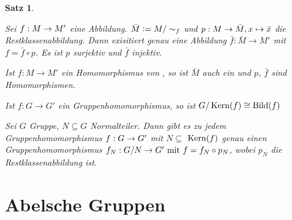 \documentclass[a4paper,10pt,german]{scrbook}
\theoremstyle{saetze}
\newtheorem{Satz}{Satz}
\theoremstyle{definitionen}
\begin{document}
\begin{Satz}
\label{Satz 1}
\mbox{}
\begin{enum}
\item 
Sei $f: M \rightarrow M'$ eine Abbildung. $\bar M \mathrel{\mathop:}=
M/\sim_f$ und $p: M \rightarrow \bar M, x \mapsto \bar x$ die
Restklassenabbildung.
Dann exisitiert genau eine Abbildung $\bar f: \bar M \to M'$ mit $f = \bar f\circ p$. Es ist $p$ surjektiv und $\bar f$ injektiv.

\item Ist $f:M \to M'$ ein Homomorphismus von \bla, so ist $\bar M$ auch ein \bla und $p$, $\bar f$ sind Homomorphismen.

\item {} \newline
Ist $f:G \to G'$ ein Gruppenhomomorphismus, so ist $G/\mathop{\rm Kern}\nolimits(f) \cong \mathop{\rm Bild}\nolimits(f)$
\item {} \newline
Sei $G$ Gruppe, $N \subseteq G$ Normalteiler. Dann gibt es zu jedem
Gruppenhomomorphismus $f:G \rightarrow G'$ mit $N \subseteq$ $\mathop{\rm Kern}\nolimits(f)$ genau
einen Gruppenhomomorphismus $f_N: G/N \rightarrow G' \mbox{ mit } f = f_N \circ p_N$, wobei $p_N$ die Restklassenabbildung ist.
\end{enum} \noindent

\end{Satz}

\section{Abelsche Gruppen}
\end{document}
